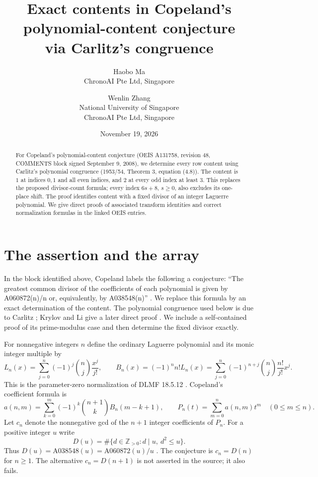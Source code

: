 \documentclass[11pt]{article}
\title{Exact contents in Copeland's polynomial-content conjecture\\via Carlitz's congruence}
\author{Haobo Ma\\\small ChronoAI Pte Ltd, Singapore
\and Wenlin Zhang\\\small National University of Singapore\\\small ChronoAI Pte Ltd, Singapore}
\date{November 19, 2026}
\begin{document}
\maketitle
\begin{abstract}
For Copeland's polynomial-content conjecture (OEIS A131758, revision 48,
COMMENTS block signed September 9, 2008), we determine every row content
using Carlitz's polynomial congruence (1953/54, Theorem 3, equation (4.8)).
The content is $1$ at indices $0,1$ and all even indices, and $2$ at every
odd index at least $3$. This replaces the proposed divisor-count formula;
every index $6s+8$, $s\geq0$, also excludes its one-place shift.
The proof identifies content with a fixed divisor of an integer Laguerre
polynomial. We give direct proofs of associated transform identities and
correct normalization formulas in the linked OEIS entries.
\end{abstract}

\section{The assertion and the array}
In the block identified above, Copeland labels the following a conjecture:
``The greatest common divisor of the coefficients of each polynomial is
given by A060872(n)/n or, equivalently, by A038548(n)'' \cite{copeland}.
We replace this formula by an exact determination of the content.
The polynomial congruence used below is due to Carlitz \cite{carlitz};
Krylov and Li give a later direct proof \cite{krylov}. We include a
self-contained proof of its prime-modulus case and then determine the
fixed divisor exactly.

For nonnegative integers $n$ define the ordinary Laguerre polynomial and
its monic integer multiple by
\begin{equation}\label{laguerre}
 L_n(x)=\sum_{j=0}^n(-1)^j\binom nj\frac{x^j}{j!},\qquad
 B_n(x)=(-1)^n n!L_n(x)
 =\sum_{j=0}^n(-1)^{n+j}\binom nj\frac{n!}{j!}x^j.
\end{equation}
This is the parameter-zero normalization of DLMF 18.5.12 \cite{dlmf}.
Copeland's coefficient formula is
\begin{equation}\label{coefficient}
 a(n,m)=\sum_{k=0}^m(-1)^k\binom{n+1}{k}B_n(m-k+1),\qquad
 P_n(t)=\sum_{m=0}^n a(n,m)t^m \quad(0\leq m\leq n).
\end{equation}
Let $c_n$ denote the nonnegative gcd of the $n+1$ integer coefficients
of $P_n$. For a positive integer $u$ write
\[
 D(u)=\#\{d\in\mathbb Z_{>0}:d\mid u,\ d^2\leq u\}.
\]
Thus $D(u)=\mathrm{A038548}(u)=\mathrm{A060872}(u)/u$
\cite{divisors,products}. The conjecture is $c_n=D(n)$ for $n\geq1$.
The alternative $c_n=D(n+1)$ is not asserted in the source; it also fails.
\end{document}
